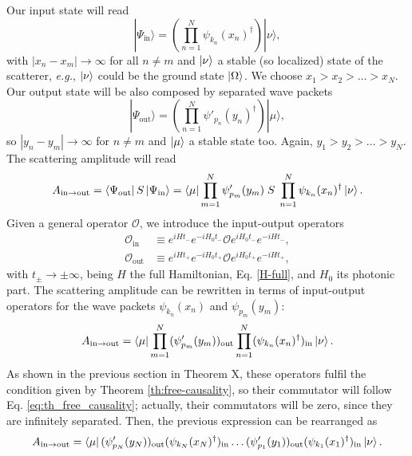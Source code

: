 \documentclass[notitlepage, prx, preprint, amsmath,superscriptaddress,amssymb]{revtex4-1}
\begin{document}
Our input state will read
\begin{equation}
|\Psi_\text{in}\rangle = \left(\prod_{n=1}^N \psi_{k_n}(x_n)^\dagger \right)|\nu\rangle,
\end{equation}
with $|x_n-x_m|\to\infty$ for all $n\neq m$ and $\ket{\nu}$ a stable (so localized) state of the scatterer, \emph{e.g.}, $\ket{\nu}$ could be the ground state $\ket{\Omega}$. We choose $x_1>x_2>\dots >x_N$. Our output state will be also composed by separated wave packets
\begin{equation}
|\Psi_\text{out}\rangle = \left(\prod_{n=1}^N \psi'_{p_n}(y_n)^\dagger \right)|\mu\rangle,
\end{equation}
so $|y_n-y_m|\to\infty$ for $n\neq m$ and $\ket{\mu}$ a stable state too. Again, $y_1>y_2>\dots > y_N$. The scattering amplitude will read
\begin{equation}
A_{\text{in}\to\text{out}}=\bra{\Psi_\text{out}}S\ket{\Psi_\text{in}}= \bra{\mu} \prod_{m=1}^N \psi'_{p_m}(y_m)\;S\;\prod_{n=1}^N\psi_{k_n}(x_n)^\dagger\ket{\nu}.
\end{equation}
Given a general operator $\mathcal{O}$, we introduce the input-output operators
\begin{align}
\label{eq:O_in}\mathcal{O}_\text{in} & \equiv e^{iHt_-}e^{-iH_0t_-} \mathcal{O}e^{iH_0t_-}e^{-iHt_-},\\
\label{eq:O_out}\mathcal{O}_\text{out} & \equiv e^{iHt_+}e^{-iH_0t_+} \mathcal{O}e^{iH_0t_+}e^{-iHt_+},
\end{align}
with $t_\pm \to \pm \infty$, being $H$ the full Hamiltonian, Eq. \eqref{H-full}, and $H_0$ its photonic part. The scattering amplitude can be rewritten in terms of input-output operators for the wave packets $\psi_{k_n}(x_n)$ and $\psi_{p_m}(y_m)$:
\begin{equation}
A_{\text{in}\to\text{out}}=\bra{\mu} \prod_{m=1}^N (\psi'_{p_m}(y_m))_\text{out}\prod_{n=1}^N(\psi_{k_n}(x_n)^\dagger)_\text{in}\ket{\nu}.
\end{equation}
{\color{red}As shown in the previous section in Theorem X}, these operators fulfil the condition given by Theorem \ref{th:free-causality}, so their commutator will follow Eq. \eqref{eq:th_free_causality}; actually, their commutators will be zero, since they are infinitely separated. Then, the previous expression can be rearranged as
\begin{align}
A_{\text{in}\to\text{out}}  =
 \bra{\mu} 
( \psi^\prime_{p_N} (y_N)
 )_{\text{out}}
(\psi_{k_N}(x_N)^\dagger)_{\text{in}}
 \dots 
 ( 
\psi^\prime_{p_1} (y_1) 
 )
_{\text{out}}
(
\psi_{k_1}(x_1)^\dagger )_\text{in}\ket{\nu}.
\end{align}
\end{document}
